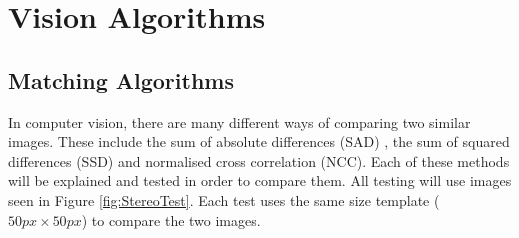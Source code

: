 \chapter{Vision Algorithms} \label{Chapter:InvestigationVision}

\section{Matching Algorithms}\label{Section:Comparison}
In computer vision, there are many different ways of comparing two similar images. These include the sum of absolute differences (SAD) \citep{Hamzah:DistanceDetection}, the sum of squared differences (SSD)\citep{Mrovlje:Distance_Stereoscopic} and  normalised cross correlation (NCC)\citep{zhao2006image}. Each of these methods will be explained and tested in order to compare them. All testing will use images seen in Figure \ref{fig:StereoTest}. Each test uses the same size template ($50px\times50px$) to compare the two images. 

